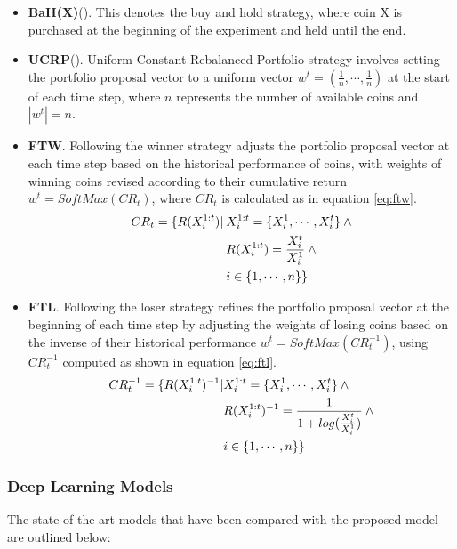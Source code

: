 \begin{itemize}
	\item \textbf{BaH(X)}(\citet{li2014online}). This denotes the buy and hold strategy, where coin X is purchased at the beginning of the experiment and held until the end.
	\item \textbf{UCRP}(\citet{li2014online}). Uniform Constant Rebalanced Portfolio strategy involves setting the portfolio proposal vector to a uniform vector $w^t=(\frac{1}{n}, \cdots, \frac{1}{n})$ at the start of each time step, where $n$ represents the number of available coins and $|w^t| = n$.	
	\item \textbf{FTW}. Following the winner strategy adjusts the portfolio proposal vector at each time step based on the historical performance of coins, with weights of winning coins revised according to their cumulative return $w^t = SoftMax(CR_t)$, where $CR_t$ is calculated as in equation \eqref{eq:ftw}.
	\begin{align}
		CR_t = \{R(X_i^{1:t})| \> &X_i^{1:t} = \{X_i^1, \cdots, X_i^t\} \> \land  \notag \\ 
		&R(X_i^{1:t}) = \frac{X_i^t}{X_i^1} \> \land \notag \\ 
		&i \in \{1, \cdots, n\}\}
		\label{eq:ftw}
	\end{align}

	\item \textbf{FTL}. Following the loser strategy refines the portfolio proposal vector at the beginning of each time step by adjusting the weights of losing coins based on the inverse of their historical performance $w^t = SoftMax(CR_t^{-1})$, using $CR_t^{-1}$ computed as shown in equation \eqref{eq:ftl}.
	\begin{align}
	CR_t^{-1} = \{R(X_i^{1:t})^{-1} | &X_i^{1:t} = \{X_i^1, \cdots, X_i^t\} \> \land \notag\\ 
	&R(X_i^{1:t})^{-1} = \frac{1}{1 + log(\frac{X_i^t}{X_i^1})} \> \land \notag \\  
	&i \in \{1, \cdots, n\} \}
	\label{eq:ftl}
	\end{align}
\end{itemize}

\subsubsection{Deep Learning Models}
The state-of-the-art models that have been compared with the proposed model are outlined below:

